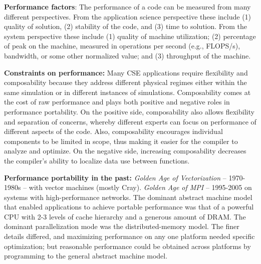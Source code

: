 \documentclass[]{article}
\begin{document}
\textbf{Performance factors}: The performance of a code can be
measured from many different perspectives. From the application science
perspective these include (1) quality of solution, (2) stability of the
code, and (3) time to solution. From the system perspective these
include (1) quality of machine utilization; (2) percentage of peak on
the machine, measured in operations per second (e.g., FLOPS/s),
bandwidth, or some other normalized value; and (3) throughput of the
machine.

\textbf{Constraints on performance:} Many CSE applications require
flexibility and composability because they address different physical
regimes either within the same simulation or in different instances of
simulations. Composability comes at the cost of raw performance and
plays both positive and negative roles in performance portability. On
the positive side, composability also allows flexibility and separation
of concerns, whereby different experts can focus on performance of
different aspects of the code. Also, composability encourages individual
components to be limited in scope, thus making it easier for the
compiler to analyze and optimize. On the negative side, increasing
composability decreases the compiler's ability to localize data use
between functions.

\textbf{Performance portability in the past:} \emph{Golden Age of
Vectorization} -- 1970-1980s -- with vector machines (mostly Cray).
\emph{Golden Age of MPI} -- 1995-2005 on systems with high-performance
networks. The dominant abstract machine model that enabled applications
to achieve portable performance was that of a powerful CPU with 2-3
levels of cache hierarchy and a generous amount of DRAM. The dominant
parallelization mode was the distributed-memory model. The finer details
differed, and maximizing performance on any one platform needed specific
optimization; but reasonable performance could be obtained across
platforms by programming to the general abstract machine model.
\end{document}
